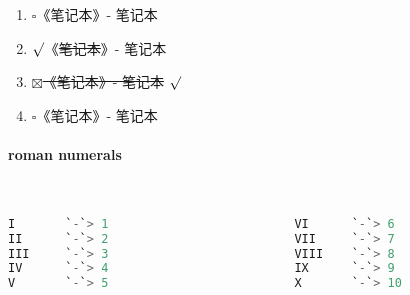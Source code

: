 \begin{enumerate}[topsep=0pt,itemsep=0pt,parsep=0pt,leftmargin=3.6em,label=\arabic*>]
    \item $\square$《笔记本》- 笔记本
    \item $\surd$《\sout{笔记本}》- 笔记本
    \item $\boxtimes$\sout{《笔记本》- 笔记本} $\surd$
    \item $\square$《笔记本》- 笔记本
\end{enumerate}

\paragraph{roman numerals}~{}

\begin{lstlisting}[language={python}]
I       `-`> 1                          VI      `-`> 6
II      `-`> 2                          VII     `-`> 7
III     `-`> 3                          VIII    `-`> 8
IV      `-`> 4                          IX      `-`> 9
V       `-`> 5                          X       `-`> 10
\end{lstlisting}



